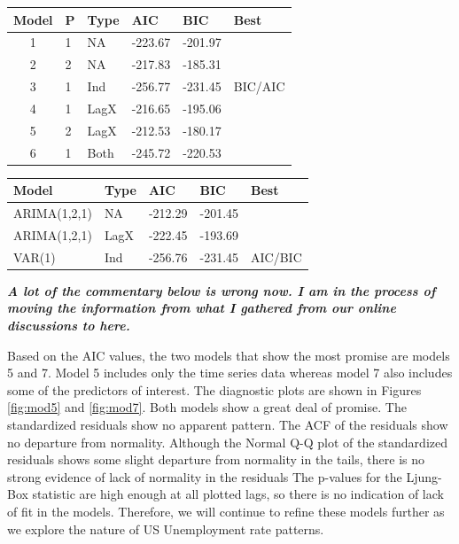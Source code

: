 \documentclass[twoside,twocolumn]{article}
\begin{document}
\begin{table}[ht]
\centering
\begin{tabular}{clllll}
  \hline
 Model & P & Type &  AIC & BIC & Best \\ 
  \hline
1  & 1 & NA  &  -223.67 & -201.97 &  \\ 
  2  & 2 & NA  &   -217.83 & -185.31 &  \\ 
  3  & 1 & Ind  & -256.77 & -231.45 & BIC/AIC \\ 
  4  & 1 & LagX & -216.65 & -195.06 &  \\ 
  5  & 2 & LagX & -212.53 & -180.17 &  \\ 
  6  & 1 & Both  & -245.72 & -220.53 &  \\ 
   \hline
\end{tabular}
\end{table}

\begin{table}[ht]
\centering
\begin{tabular}{lllll}
  \hline
Model & Type & AIC & BIC & Best \\ 
  \hline
ARIMA(1,2,1) & NA &   -212.29 & -201.45 &  \\ 
ARIMA(1,2,1) & LagX   & -222.45 & -193.69 &  \\ 
VAR(1) & Ind & -256.76 & -231.45 & AIC/BIC \\ 
   \hline
\end{tabular}
\end{table}

		
	\textbf{\textit{A lot of the commentary below is wrong now.  I am in the process of moving the information from what I gathered from our online discussions to here.}}
	
		Based on the AIC values, the two models that show the most promise are models 5 and 7.  Model 5 includes only the time series data whereas model 7 also includes some of the predictors of interest.  The diagnostic plots are shown in Figures \ref{fig:mod5} and \ref{fig:mod7}. Both models show a great deal of promise.  The standardized residuals show no apparent pattern. The ACF of the residuals show no departure from normality. Although the Normal Q-Q plot of the standardized residuals shows some slight departure from normality in the tails, there is no strong evidence of lack of normality in the residuals  The p-values for the  Ljung-Box statistic are high enough at all plotted lags, so there is no indication of lack of fit in the models. Therefore, we will continue to refine these models further as we explore the nature of US Unemployment rate patterns.
\end{document}
